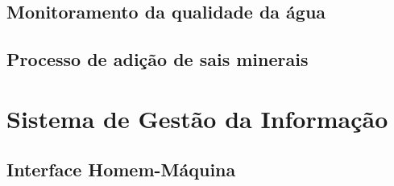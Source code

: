       
      
      
      
    \subsection{Monitoramento da qualidade da água}
    
      
      
    
    \pagebreak
    \subsection{Processo de adição de sais minerais}
    
      
    
  \vfill
  \pagebreak
  \section{Sistema de Gestão da Informação}
      
      
    \subsection{Interface Homem-Máquina}
      

    
    
    
    
    